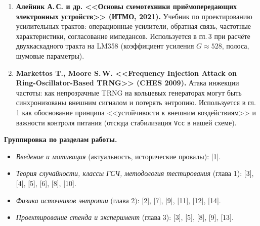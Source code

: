 \documentclass[12pt,a4paper]{extarticle}
\begin{document}
\begin{enumerate}
  \item \textbf{Алейник А.\,С. и др. <<Основы схемотехники приёмопередающих
    электронных устройств>> (ИТМО, 2021).} Учебник по проектированию
    усилительных трактов: операционные усилители, обратная связь,
    частотные характеристики, согласование импедансов. Используется в
    гл.\,3 при расчёте двухкаскадного тракта на LM358 (коэффициент усиления
    $G\!\approx\!528$, полоса, шумовые параметры).

  \item \textbf{Markettos T., Moore S.\,W. <<Frequency Injection Attack on
    Ring-Oscillator-Based TRNG>> (CHES 2009).} Атака инжекции частоты:
    как непрозрачные TRNG на кольцевых генераторах могут быть синхронизованы
    внешним сигналом и потерять энтропию. Используется в гл.\,1 как
    обоснование принципа <<устойчивости к внешним воздействиям>> и
    важности контроля питания (отсюда стабилизация \texttt{Vcc} в нашей
    схеме).
\end{enumerate}

\textbf{Группировка по разделам работы.}
\begin{itemize}
  \setlength{\itemsep}{0.15em}
  \item \emph{Введение и мотивация} (актуальность, исторические провалы):
        [1].
  \item \emph{Теория случайности, классы ГСЧ, методология тестирования}
        (глава 1): [3], [4], [5], [6], [8], [10].
  \item \emph{Физика источников энтропии} (глава 2): [2], [7], [9], [11],
        [12], [14].
  \item \emph{Проектирование стенда и эксперимент} (глава 3): [3], [5], [8],
        [9], [13].
\end{itemize}
\end{document}
